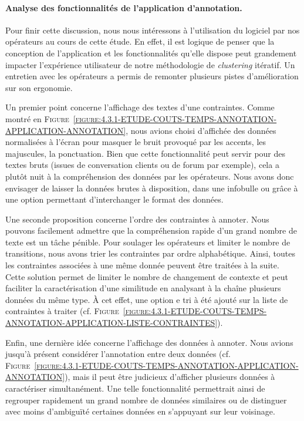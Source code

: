 		\paragraph{Analyse des fonctionnalités de l'application d'annotation.}
		
			Pour finir cette discussion, nous nous intéressons à l'utilisation du logiciel par nos opérateurs au cours de cette étude.
			En effet, il est logique de penser que la conception de l'application et les fonctionnalités qu'elle dispose peut grandement impacter l'expérience utilisateur de notre méthodologie de \textit{clustering} itératif.
			Un entretien avec les opérateurs a permis de remonter plusieurs pistes d'amélioration sur son ergonomie.
			
			Un premier point concerne l'affichage des textes d'une contraintes.
			Comme montré en \textsc{Figure~\ref{figure:4.3.1-ETUDE-COUTS-TEMPS-ANNOTATION-APPLICATION-ANNOTATION}}, nous avions choisi d'affichée des données normalisées à l'écran pour masquer le bruit provoqué par les accents, les majuscules, la ponctuation.
			Bien que cette fonctionnalité peut servir pour des textes bruts (issues de conversation clients ou de forum par exemple), cela a plutôt nuit à la compréhension des données par les opérateurs.
			Nous avons donc envisager de laisser la données brutes à disposition, dans une infobulle ou grâce à une option permettant d'interchanger le format des données.
			
			Une seconde proposition concerne l'ordre des contraintes à annoter.
			Nous pouvons facilement admettre que la compréhension rapide d'un grand nombre de texte est un tâche pénible.
			Pour soulager les opérateurs et limiter le nombre de transitions, nous avons trier les contraintes par ordre alphabétique.
			Ainsi, toutes les contraintes associées à une même donnée peuvent être traitées à la suite.
			Cette solution permet de limiter le nombre de changement de contexte et peut faciliter la caractérisation d'une similitude en analysant à la chaîne plusieurs données du même type.
			À cet effet, une option e tri à été ajouté sur la liste de contraintes à traiter (cf. \textsc{Figure~\ref{figure:4.3.1-ETUDE-COUTS-TEMPS-ANNOTATION-APPLICATION-LISTE-CONTRAINTES}}).
			
			Enfin, une dernière idée concerne l'affichage des données à annoter.
			Nous avions jusqu'à présent considérer l'annotation entre deux données (cf. \textsc{Figure~\ref{figure:4.3.1-ETUDE-COUTS-TEMPS-ANNOTATION-APPLICATION-ANNOTATION}}), mais il peut être judicieux d'afficher plusieurs données à caractériser simultanément.
			Une telle fonctionnalité permettrait ainsi de regrouper rapidement un grand nombre de données similaires ou de distinguer avec moins d'ambiguïté certaines données en s'appuyant sur leur voisinage.
			
